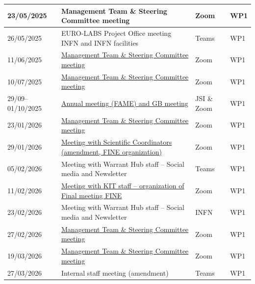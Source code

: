 \begin{longtable}{|L{0.18\textwidth}|C{0.48\textwidth}|C{0.12\textwidth}|C{0.10\textwidth}|}
23/05/2025 &
Management Team \& Steering Committee meeting &
Zoom & WP1 \\ \hline

26/05/2025 &
EURO-LABS Project Office meeting INFN and INFN facilities &
Teams & WP1 \\ \hline

11/06/2025 &
\href{https://cnrs.zoom.us/j/97354004837?pwd=6SEMM7rebRTsPlDO6PDfYmylhzpxQS.1}
{Management Team \& Steering Committee meeting} &
Zoom & WP1 \\ \hline

10/07/2025 &
\href{https://agenda.infn.it/event/53029/}
{Management Team \& Steering Committee meeting} &
Zoom & WP1 \\ \hline

29/09--01/10/2025 &
\href{https://indico.cern.ch/event/1572254/overview}
{Annual meeting (FAME) and GB meeting} &
JSI \& Zoom & WP1 \\ \hline

23/01/2026 &
\href{https://agenda.infn.it/event/50218/}
{Management Team \& Steering Committee meeting} &
Zoom & WP1 \\ \hline

29/01/2026 &
\href{https://cnrs.zoom.us/j/99645413746?pwd=ttYU9DUoT0MCme5cMv2aWTKnKoiWEO.1}
{Meeting with Scientific Coordinators (amendment, FINE organization)} &
Zoom & WP1 \\ \hline

05/02/2026 &
Meeting with Warrant Hub staff -- Social media and Newsletter &
Teams & WP1 \\ \hline

11/02/2026 &
\href{https://cnrs.zoom.us/j/94198661686?pwd=vXSIJGZSKqdj4bF2ezFi834t6tEmcN.1}
{Meeting with KIT staff -- organization of Final meeting FINE} &
Zoom & WP1 \\ \hline

23/02/2026 &
Meeting with Warrant Hub staff -- Social media and Newsletter &
INFN & WP1 \\ \hline

27/02/2026 &
\href{https://agenda.infn.it/event/51115/}
{Management Team \& Steering Committee meeting} &
Zoom & WP1 \\ \hline

19/03/2026 &
\href{https://agenda.infn.it/event/51115/}
{Management Team \& Steering Committee meeting} &
Zoom & WP1 \\ \hline

27/03/2026 &
Internal staff meeting (amendment) &
Teams & WP1 \\ \hline


\end{longtable}
